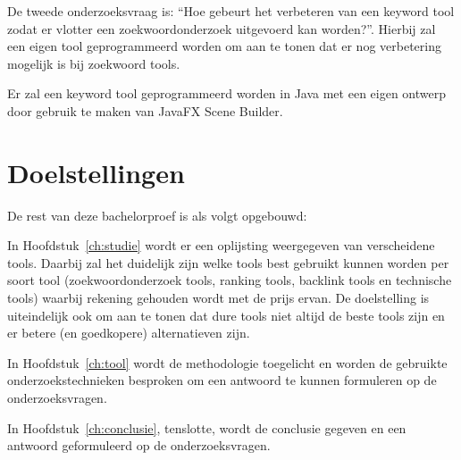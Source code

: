 De tweede onderzoeksvraag is: “Hoe gebeurt het verbeteren van een keyword tool zodat er vlotter een zoekwoordonderzoek uitgevoerd kan worden?”. Hierbij zal een eigen tool geprogrammeerd worden om aan te tonen dat er nog verbetering mogelijk is bij zoekwoord tools. 

Er zal een keyword tool geprogrammeerd worden in Java met een eigen ontwerp door gebruik te maken van JavaFX Scene Builder. 


\section{Doelstellingen}
\label{sec:doelstellingen}

De rest van deze bachelorproef is als volgt opgebouwd:

In Hoofdstuk~\ref{ch:studie} wordt er een oplijsting  weergegeven van verscheidene tools. Daarbij zal het duidelijk zijn welke tools best gebruikt kunnen worden per soort tool (zoekwoordonderzoek tools, ranking tools, backlink tools en technische tools) waarbij rekening gehouden wordt met de prijs ervan. De doelstelling is uiteindelijk ook om aan te tonen dat dure tools niet altijd de beste tools zijn en er betere (en goedkopere) alternatieven zijn. 

In Hoofdstuk~\ref{ch:tool} wordt de methodologie toegelicht en worden de gebruikte onderzoekstechnieken besproken om een antwoord te kunnen formuleren op de onderzoeksvragen.


In Hoofdstuk~\ref{ch:conclusie}, tenslotte, wordt de conclusie gegeven en een antwoord geformuleerd op de onderzoeksvragen. 

